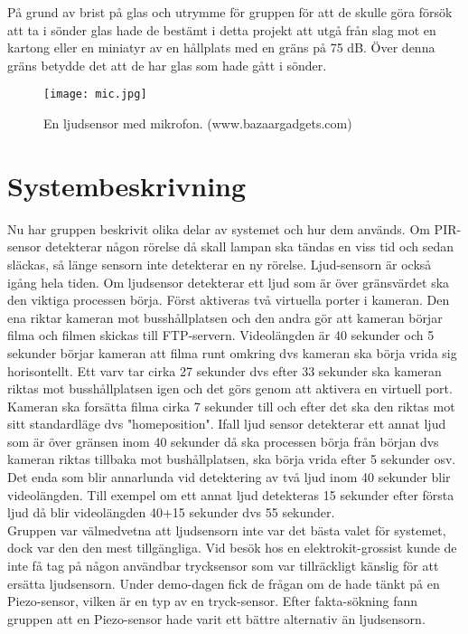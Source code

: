 På grund av brist på glas och utrymme för gruppen för att de skulle  göra försök att ta i sönder glas hade de bestämt i detta projekt att utgå från slag mot en kartong eller en miniatyr av en hållplats med en gräns på 75 dB. Över denna gräns betydde det att de har glas som hade gått i sönder.\\
\begin{figure}[h]

  \texttt{[image: mic.jpg]}
  \caption{En ljudsensor med mikrofon. (www.bazaargadgets.com)}
  \label{fig:mic}
\end{figure}
\clearpage
\section{Systembeskrivning}
Nu har gruppen beskrivit olika delar av systemet och hur dem används. Om PIR-sensor detekterar någon rörelse då skall lampan ska tändas en viss tid och sedan släckas, så länge sensorn inte detekterar en ny rörelse. Ljud-sensorn är också igång hela tiden. Om ljudsensor detekterar ett ljud som är över gränsvärdet ska den viktiga processen börja. Först aktiveras två virtuella porter i kameran. Den ena riktar kameran mot busshållplatsen och den andra gör att kameran börjar filma och filmen skickas till FTP-servern. Videolängden är 40 sekunder och 5 sekunder börjar kameran att filma runt omkring dvs kameran ska börja vrida sig horisontellt. Ett varv tar cirka 27 sekunder dvs efter 33 sekunder ska kameran riktas mot busshållplatsen igen och det görs genom att aktivera en virtuell port. Kameran ska forsätta filma cirka 7 sekunder till och efter det ska den riktas mot sitt standardläge dvs "homeposition". Ifall ljud sensor detekterar ett annat ljud som är över gränsen inom 40 sekunder då ska processen börja från början dvs kameran riktas tillbaka mot bushållplatsen, ska börja vrida efter 5 sekunder osv. Det enda som blir annarlunda vid detektering av två ljud inom 40 sekunder blir videolängden. Till exempel om ett annat ljud detekteras 15 sekunder efter första ljud då blir videolängden 40+15 sekunder dvs 55 sekunder.\\
Gruppen var välmedvetna att ljudsensorn inte var det bästa valet för systemet, dock var den den mest tillgängliga. Vid besök hos en elektrokit-grossist kunde de inte få tag på någon användbar trycksensor som var tillräckligt känslig för att ersätta ljudsensorn. Under demo-dagen fick de frågan om de hade tänkt på en Piezo-sensor, vilken är en typ av en tryck-sensor. Efter fakta-sökning fann gruppen att en Piezo-sensor hade varit ett bättre alternativ än ljudsensorn.


